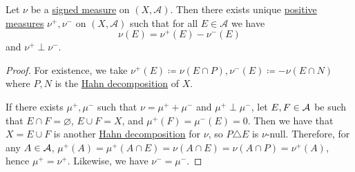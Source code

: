\begin{theorem}\label{thm:Jordan-decomposition-theorem}
  Let \(\nu\) be a \hyperref[def:signed-measure]{signed measure} on \((X, \mathcal{A})\). Then there exists unique \hyperref[def:measure]{positive measures} \(\nu^+,\nu^-\)
  on \((X, \mathcal{A})\) such that for all \(E \in \mathcal{A}\) we have
  \[
    \nu(E) = \nu^+(E) - \nu^-(E)
  \]
  and \(\nu^+ \perp \nu^-\).
\end{theorem}
\begin{proof}
  For existence, we take \(\nu^+(E) \coloneqq \nu(E \cap P), \nu^-(E) \coloneqq -\nu(E \cap N)\) where \(P, N\) is the
  \hyperref[thm:Hahn-decomposition-theorem]{Hahn decomposition} of \(X\).

  If there exists \(\mu ^+, \mu ^-\) such that \(\nu = \mu ^+ + \mu ^-\) and \(\mu ^+ \perp \mu ^-\), let \(E, F\in \mathcal{\MakeUppercase{a}} \) be
  such that \(E\cap F = \varnothing \), \(E\cup F= X\), and \(\mu ^+(F) = \mu ^-(E) = 0\). Then we have that \(X = E \cup F\) is another
  \hyperref[thm:Hahn-decomposition-theorem]{Hahn decomposition} for \(\nu \), so \(P\triangle E\) is \(\nu\)-null. Therefore, for any
  \(A \in \mathcal{\MakeUppercase{a}} \), \(\mu ^+(A) = \mu ^+(A \cap E) = \nu (A \cap E) = \nu (A \cap P) = \nu ^+(A)\), hence \(\mu ^+ = \nu ^+\).
  Likewise, we have \(\nu ^- = \mu ^-\).
\end{proof}